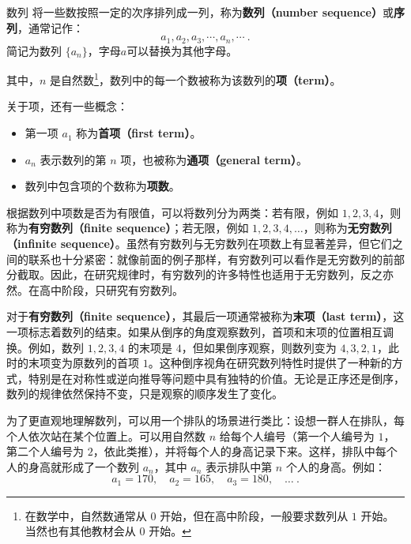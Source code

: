 \begin{definition}{数列}
将一些数按照一定的次序排列成一列，称为\textbf{数列（number sequence）}或\textbf{序列}，通常记作：
\begin{equation}
a_1, a_2, a_3, \cdots, a_n, \cdots~.
\end{equation}
简记为数列 $\{a_n\}$，字母$a$可以替换为其他字母。

其中，$n$ 是自然数\footnote{在数学中，自然数通常从 $0$ 开始，但在高中阶段，一般要求数列从 $1$ 开始。当然也有其他教材会从 $0$ 开始。}，数列中的每一个数被称为该数列的\textbf{项（term）}。
\end{definition}

关于项，还有一些概念：
\begin{itemize}
\item 第一项 $a_1$ 称为\textbf{首项（first term）}。 
\item $a_n$ 表示数列的第 $n$ 项，也被称为\textbf{通项（general term）}。
\item 数列中包含项的个数称为\textbf{项数}。
\end{itemize}

根据数列中项数是否为有限值，可以将数列分为两类：若有限，例如 $1, 2, 3, 4$，则称为\textbf{有穷数列（finite sequence）}；若无限，例如 $1, 2, 3, 4, \dots$，则称为\textbf{无穷数列（infinite sequence）}。虽然有穷数列与无穷数列在项数上有显著差异，但它们之间的联系也十分紧密：就像前面的例子那样，有穷数列可以看作是无穷数列的前部分截取。因此，在研究规律时，有穷数列的许多特性也适用于无穷数列，反之亦然。在高中阶段，只研究有穷数列。

对于\textbf{有穷数列（finite sequence）}，其最后一项通常被称为\textbf{末项（last term）}，这一项标志着数列的结束。如果从倒序的角度观察数列，首项和末项的位置相互调换。例如，数列 $1, 2, 3, 4$ 的末项是 $4$，但如果倒序观察，则数列变为 $4, 3, 2, 1$，此时的末项变为原数列的首项 $1$。这种倒序视角在研究数列特性时提供了一种新的方式，特别是在对称性或逆向推导等问题中具有独特的价值。无论是正序还是倒序，数列的规律依然保持不变，只是观察的顺序发生了变化。

为了更直观地理解数列，可以用一个排队的场景进行类比：设想一群人在排队，每个人依次站在某个位置上。可以用自然数 $n$ 给每个人编号（第一个人编号为 $1$，第二个人编号为 $2$，依此类推），并将每个人的身高记录下来。这样，排队中每个人的身高就形成了一个数列 ${a_n}$，其中 $a_n$ 表示排队中第 $n$ 个人的身高。例如：
\begin{equation}
a_1 = 170, \quad a_2 = 165, \quad a_3 = 180, \quad \dots~.
\end{equation}

